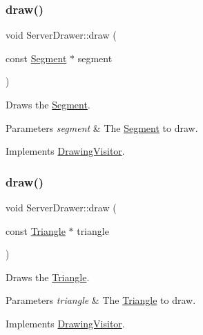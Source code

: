 \subsubsection{\texorpdfstring{draw()}{draw()}\hspace{0.1cm}{\footnotesize\ttfamily [2/5]}}
{\footnotesize\ttfamily void Server\+Drawer\+::draw (\begin{DoxyParamCaption}\item[{const \hyperlink{class_segment}{Segment} $\ast$}]{segment }\end{DoxyParamCaption})\hspace{0.3cm}{\ttfamily [virtual]}}

Draws the \hyperlink{class_segment}{Segment}. 
\begin{DoxyParams}{Parameters}
{\em segment} & The \hyperlink{class_segment}{Segment} to draw. \\
\hline
\end{DoxyParams}


Implements \hyperlink{class_drawing_visitor_a8a95018de31a7e3d7a067c347478ffde}{Drawing\+Visitor}.

\hypertarget{class_server_drawer_aad913eff7f5c248003ef70ec8c09d2b2}{}\label{class_server_drawer_aad913eff7f5c248003ef70ec8c09d2b2} 
\subsubsection{\texorpdfstring{draw()}{draw()}\hspace{0.1cm}{\footnotesize\ttfamily [3/5]}}
{\footnotesize\ttfamily void Server\+Drawer\+::draw (\begin{DoxyParamCaption}\item[{const \hyperlink{class_triangle}{Triangle} $\ast$}]{triangle }\end{DoxyParamCaption})\hspace{0.3cm}{\ttfamily [virtual]}}

Draws the \hyperlink{class_triangle}{Triangle}. 
\begin{DoxyParams}{Parameters}
{\em triangle} & The \hyperlink{class_triangle}{Triangle} to draw. \\
\hline
\end{DoxyParams}


Implements \hyperlink{class_drawing_visitor_a178aa7e1bb9cfbd538d7de0dbfa2d4b1}{Drawing\+Visitor}.

\hypertarget{class_server_drawer_acd973f89e7618d67fcd8db364df0b6bf}{}\label{class_server_drawer_acd973f89e7618d67fcd8db364df0b6bf} 
